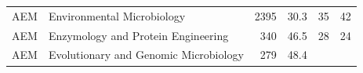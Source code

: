 \documentclass[11pt,]{article}
\begin{document}
\begin{longtable}[]{@{}llrrrr@{}}
\begin{minipage}[t]{0.06\columnwidth}
AEM\strut
\end{minipage} & \begin{minipage}[t]{0.43\columnwidth}\raggedright\strut
Environmental Microbiology\strut
\end{minipage} & \begin{minipage}[t]{0.04\columnwidth}\raggedleft\strut
2395\strut
\end{minipage} & \begin{minipage}[t]{0.08\columnwidth}\raggedleft\strut
30.3\strut
\end{minipage} & \begin{minipage}[t]{0.11\columnwidth}\raggedleft\strut
35\strut
\end{minipage} & \begin{minipage}[t]{0.11\columnwidth}\raggedleft\strut
42\strut
\end{minipage}\tabularnewline
\begin{minipage}[t]{0.06\columnwidth}\raggedright\strut
AEM\strut
\end{minipage} & \begin{minipage}[t]{0.43\columnwidth}\raggedright\strut
Enzymology and Protein Engineering\strut
\end{minipage} & \begin{minipage}[t]{0.04\columnwidth}\raggedleft\strut
340\strut
\end{minipage} & \begin{minipage}[t]{0.08\columnwidth}\raggedleft\strut
46.5\strut
\end{minipage} & \begin{minipage}[t]{0.11\columnwidth}\raggedleft\strut
28\strut
\end{minipage} & \begin{minipage}[t]{0.11\columnwidth}\raggedleft\strut
24\strut
\end{minipage}\tabularnewline
\begin{minipage}[t]{0.06\columnwidth}\raggedright\strut
AEM\strut
\end{minipage} & \begin{minipage}[t]{0.43\columnwidth}\raggedright\strut
Evolutionary and Genomic Microbiology\strut
\end{minipage} & \begin{minipage}[t]{0.04\columnwidth}\raggedleft\strut
279\strut
\end{minipage} & \begin{minipage}[t]{0.08\columnwidth}\raggedleft\strut
48.4\strut
\end{minipage} & \begin{minipage}[t]{0.11\columnwidth}\raggedleft\strut

\end{minipage}
\end{longtable}
\end{document}
